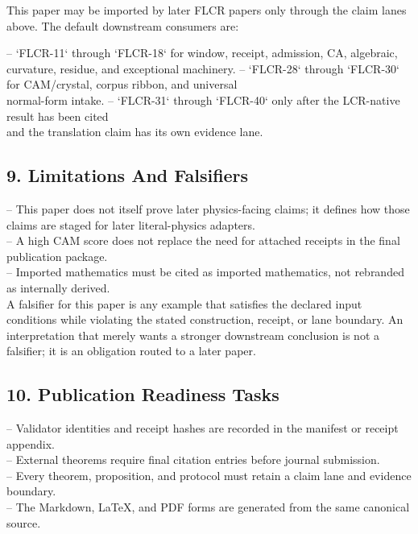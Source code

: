 \documentclass[11pt]{article}
\begin{document}
This paper may be imported by later FLCR papers only through the claim lanes
above. The default downstream consumers are:

\noindent{}-- `FLCR-11` through `FLCR-18` for window, receipt, admission, CA, algebraic,\\
  curvature, residue, and exceptional machinery.
\noindent{}-- `FLCR-28` through `FLCR-30` for CAM/crystal, corpus ribbon, and universal\\
  normal-form intake.
\noindent{}-- `FLCR-31` through `FLCR-40` only after the LCR-native result has been cited\\
  and the translation claim has its own evidence lane.

\subsection*{9. Limitations And Falsifiers}

\noindent{}-- This paper does not itself prove later physics-facing claims; it defines how those claims are staged for later literal-physics adapters.\\
\noindent{}-- A high CAM score does not replace the need for attached receipts in the final publication package.\\
\noindent{}-- Imported mathematics must be cited as imported mathematics, not rebranded as internally derived.\\

A falsifier for this paper is any example that satisfies the declared input
conditions while violating the stated construction, receipt, or lane boundary.
An interpretation that merely wants a stronger downstream conclusion is not a
falsifier; it is an obligation routed to a later paper.

\subsection*{10. Publication Readiness Tasks}

\noindent{}-- Validator identities and receipt hashes are recorded in the manifest or receipt appendix.\\
\noindent{}-- External theorems require final citation entries before journal submission.\\
\noindent{}-- Every theorem, proposition, and protocol must retain a claim lane and evidence boundary.\\
\noindent{}-- The Markdown, LaTeX, and PDF forms are generated from the same canonical source.\\
\end{document}
